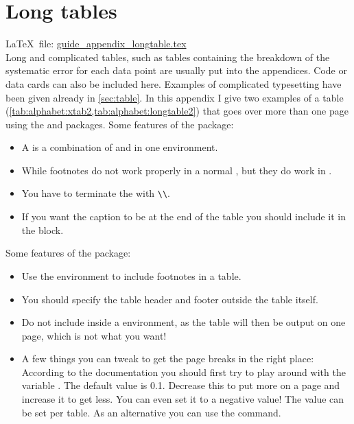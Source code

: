 
\chapter{Long tables}%
\label{sec:app:tables}

\LaTeX\ file: \href{run:./guide_appendix_longtable.tex}{guide\_appendix\_longtable.tex}\\[1ex]
\noindent
Long and complicated tables, such as tables containing the breakdown
of the systematic error for each data point are usually put into the
appendices. Code or data cards can also be included here.
Examples of complicated typesetting have been given already in \cref{sec:table}.
In this appendix I give two examples of a table
(\cref{tab:alphabet:xtab2,tab:alphabet:longtable2}) that goes over more than one page
using the  and  packages.
Some features of the  package:
\begin{itemize}\setlength{\parskip}{0pt}
  \item A  is a combination of  and  in one environment. 
  \item While footnotes do not work properly in a normal ,
    but they do work in .
  \item You have to terminate the  with \verb|\\|.
  \item If you want the caption to be at the end of the table you should include 
    it in the  block.
\end{itemize}

Some features of the  package:
\begin{itemize}\setlength{\parskip}{0pt}
  \item Use the  environment to include footnotes in a table.
  \item You should specify the table header and footer outside the table itself.
  \item Do not include  inside a  environment, as the table will
    then be output on one page, which is not what you want!
  \item A few things you can tweak to get the page breaks in the right place:
    According to the  documentation you should first try to play
    around with the variable . The default value is \num{0.1}.
    Decrease this to put more on a page and increase it to get less.
    You can even set it to a negative value!
    The value can be set per table.
    As an alternative you can use the  command.
\end{itemize}

